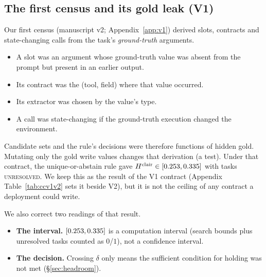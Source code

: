 \documentclass{article}
\begin{document}
\subsection{The first census and its gold leak (V1)}
\label{sec:v1}
Our first census (manuscript v2; Appendix~\ref{app:v1}) derived slots,
contracts and state-changing calls from the task's \emph{ground-truth}
arguments.
\begin{itemize}
\item A slot was an argument whose ground-truth value was absent from the
prompt but present in an earlier output.
\item Its contract was the (tool, field) where that value occurred.
\item Its extractor was chosen by the value's type.
\item A call was state-changing if the ground-truth execution changed the
environment.
\end{itemize}
Candidate sets and the rule's decisions were therefore functions of hidden
gold. Mutating only the gold write values changes that derivation (a
test). Under that contract, the unique-or-abstain rule gave
$H^{\mathrm{clair}}\in[0.253,0.335]$ with \AdjUnresolved{} tasks
\textsc{unresolved}. We keep this as the result of the V1 contract
(Appendix Table~\ref{tab:ccv1v2} sets it beside V2), but it is not the
ceiling of any contract a deployment could write.

We also correct two readings of that result.
\begin{itemize}
\item \textbf{The interval.} $[0.253,0.335]$ is a computation interval
(search bounds plus unresolved tasks counted as $0$/$1$), not a confidence
interval.
\item \textbf{The decision.} Crossing $\delta$ only means the sufficient
condition for holding was not met (\S\ref{sec:headroom}).
\end{itemize}
\end{document}
